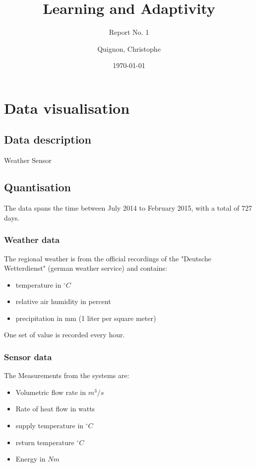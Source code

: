 \documentclass{scrartcl}
\begin{document}
\title{Learning and Adaptivity}
\subtitle{Report No. 1}
\author{
  Quignon, Christophe
}
\date{\today}


\maketitle

\section{Data visualisation}
\subsection{Data description}

Weather
Sensor

\subsection{Quantisation}
The data spans the time between July 2014 to February 2015, with a total of 727 days.

\subsubsection{Weather data}
The regional weather is from the official recordings of the "Deutsche Wetterdienst" (german weather service) and contains:

\begin{itemize}
\item temperature in $^\circ C$
\item relative air humidity in percent
\item precipitation in mm (1 liter per square meter)
\end{itemize}

One set of value is recorded every hour.

\subsubsection{Sensor data}
The Measurements from the systems are:

\begin{itemize}
\item Volumetric flow rate in $m^3 / s$
\item Rate of heat flow in watts
\item supply temperature in $^\circ C$
\item return temperature $^\circ C$
\item Energy in $Nm$
\end{itemize}
\end{document}
